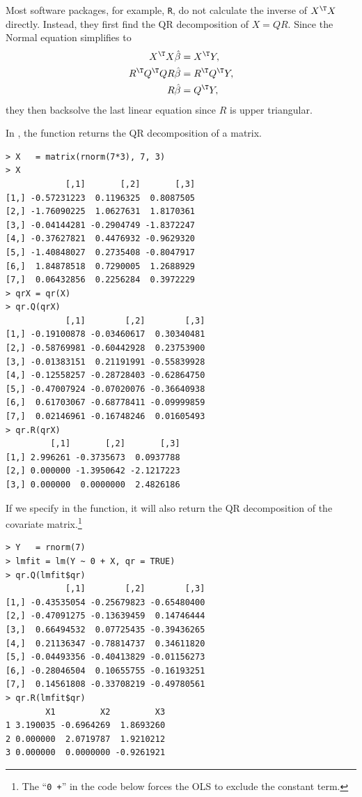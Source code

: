 Most software packages, for example, \texttt{R}, do not calculate the inverse of $X^{\T} X$ directly. Instead, they first find the QR decomposition of $X = QR$. Since the Normal equation simplifies to 
\begin{align*}
X^{\T}X\hat{\beta} & =X^{\T}Y,\\
R^{\T}Q^{\T}QR\hat{\beta} & =R^{\T}Q^{\T}Y,\\
R\hat{\beta} & =Q^{\T}Y,
\end{align*}
they then backsolve the last linear equation since $R$ is upper triangular. 



In , the  function returns the QR decomposition of a matrix. 

\begin{lstlisting}
> X   = matrix(rnorm(7*3), 7, 3)
> X
            [,1]       [,2]       [,3]
[1,] -0.57231223  0.1196325  0.8087505
[2,] -1.76090225  1.0627631  1.8170361
[3,] -0.04144281 -0.2904749 -1.8372247
[4,] -0.37627821  0.4476932 -0.9629320
[5,] -1.40848027  0.2735408 -0.8047917
[6,]  1.84878518  0.7290005  1.2688929
[7,]  0.06432856  0.2256284  0.3972229
> qrX = qr(X)
> qr.Q(qrX)
            [,1]        [,2]        [,3]
[1,] -0.19100878 -0.03460617  0.30340481
[2,] -0.58769981 -0.60442928  0.23753900
[3,] -0.01383151  0.21191991 -0.55839928
[4,] -0.12558257 -0.28728403 -0.62864750
[5,] -0.47007924 -0.07020076 -0.36640938
[6,]  0.61703067 -0.68778411 -0.09999859
[7,]  0.02146961 -0.16748246  0.01605493
> qr.R(qrX)
         [,1]       [,2]       [,3]
[1,] 2.996261 -0.3735673  0.0937788
[2,] 0.000000 -1.3950642 -2.1217223
[3,] 0.000000  0.0000000  2.4826186
\end{lstlisting}


If we specify  in the  function, it will also return the QR decomposition of the covariate matrix.\footnote{The ``\texttt{0 +}'' in the code below forces the OLS to exclude the constant term.} 

\begin{lstlisting}
> Y   = rnorm(7)
> lmfit = lm(Y ~ 0 + X, qr = TRUE)
> qr.Q(lmfit$qr)
            [,1]        [,2]        [,3]
[1,] -0.43535054 -0.25679823 -0.65480400
[2,] -0.47091275 -0.13639459  0.14746444
[3,]  0.66494532  0.07725435 -0.39436265
[4,]  0.21136347 -0.78814737  0.34611820
[5,] -0.04493356 -0.40413829 -0.01156273
[6,] -0.28046504  0.10655755 -0.16193251
[7,]  0.14561808 -0.33708219 -0.49780561
> qr.R(lmfit$qr)
        X1         X2         X3
1 3.190035 -0.6964269  1.8693260
2 0.000000  2.0719787  1.9210212
3 0.000000  0.0000000 -0.9261921
\end{lstlisting}


